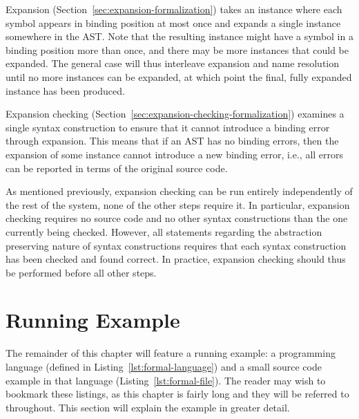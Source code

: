 \documentclass{kththesis}
\begin{document}
Expansion (Section~\ref{sec:expansion-formalization}) takes an instance where each symbol appears in binding position at most once and expands a single instance somewhere in the AST. Note that the resulting instance might have a symbol in a binding position more than once, and there may be more instances that could be expanded. The general case will thus interleave expansion and name resolution until no more instances can be expanded, at which point the final, fully expanded instance has been produced.

Expansion checking (Section~\ref{sec:expansion-checking-formalization}) examines a single syntax construction to ensure that it cannot introduce a binding error through expansion. This means that if an AST has no binding errors, then the expansion of some instance cannot introduce a new binding error, i.e., all errors can be reported in terms of the original source code.

As mentioned previously, expansion checking can be run entirely independently of the rest of the system, none of the other steps require it. In particular, expansion checking requires no source code and no other syntax constructions than the one currently being checked. However, all statements regarding the abstraction preserving nature of syntax constructions requires that each syntax construction has been checked and found correct. In practice, expansion checking should thus be performed before all other steps.


\section{Running Example}

The remainder of this chapter will feature a running example: a programming language (defined in Listing~\ref{lst:formal-language}) and a small source code example in that language (Listing~\ref{lst:formal-file}). The reader may wish to bookmark these listings, as this chapter is fairly long and they will be referred to throughout. This section will explain the example in greater detail.
\end{document}
